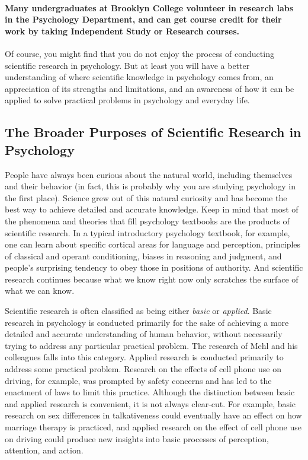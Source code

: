 \paragraph{Many undergraduates at Brooklyn College volunteer in research labs in the Psychology Department, and can get course credit for their work by taking Independent Study or Research courses.}

Of course, you might find that you do not enjoy the process of conducting scientific research in psychology. But at least you will have a better understanding of where scientific knowledge in psychology comes from, an appreciation of its strengths and limitations, and an awareness of how it can be applied to solve practical problems in psychology and everyday life.

\subsection{The Broader Purposes of Scientific Research in Psychology}
People have always been curious about the natural world, including themselves and their behavior (in fact, this is probably why you are studying psychology in the first place). Science grew out of this natural curiosity and has become the best way to achieve detailed and accurate knowledge. Keep in mind that most of the phenomena and theories that fill psychology textbooks are the products of scientific research. In a typical introductory psychology textbook, for example, one can learn about specific cortical areas for language and perception, principles of classical and operant conditioning, biases in reasoning and judgment, and people's surprising tendency to obey those in positions of authority. And scientific research continues because what we know right now only scratches the surface of what we can know.

Scientific research is often classified as being either \emph{basic} or \emph{applied}. Basic research in psychology is conducted primarily for the sake of achieving a more detailed and accurate understanding of human behavior, without necessarily trying to address any particular practical problem. The research of Mehl and his colleagues falls into this category. Applied research is conducted primarily to address some practical problem. Research on the effects of cell phone use on driving, for example, was prompted by safety concerns and has led to the enactment of laws to limit this practice. Although the distinction between basic and applied research is convenient, it is not always clear-cut. For example, basic research on sex differences in talkativeness could eventually have an effect on how marriage therapy is practiced, and applied research on the effect of cell phone use on driving could produce new insights into basic processes of perception, attention, and action.

